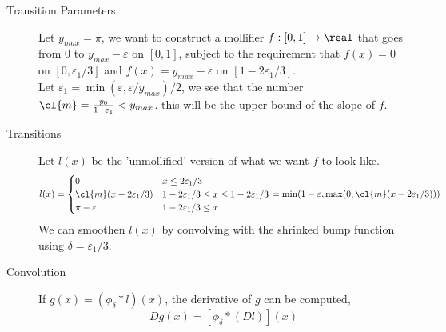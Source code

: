 \documentclass[../main-v2-manifolds.tex]{subfiles}
\begin{document}
\clearpage
    \begin{description}
    \item[Transition Parameters]
    Let $y_{max} = \pi$, we want to construct a mollifier $f:[0,1]\to\real$ that goes from $0$ to $y_{max} - \varepsilon$ on $[0,1]$, subject to the requirement that $f(x) = 0$ on $[0,\varepsilon_1/3]$ and $f(x) = y_{max} - \varepsilon$ on $[1-2\varepsilon_1/3]$.\\
    
    Let $\varepsilon_1 = \min(\varepsilon,\varepsilon/y_{max})/2$, we see that the number $\cl{m} = \frac{y_0}{1-\varepsilon_1}<y_{max}$. this will be the upper bound of the slope of $f$.
    \item[Transitions]
    Let $l(x)$ be the 'unmollified' version of what we want $f$ to look like.
    \[
        l(x) = \begin{cases}
            0 & x\leq 2\varepsilon_1/3\\ 
            \cl{m}(x-2\varepsilon_1/3) & 1-2\varepsilon_1/3\leq x\leq 1-2\varepsilon_1/3\\
            \pi-\varepsilon & 1-2\varepsilon_1/3\leq x
        \end{cases} = \min(1-\varepsilon,\max(0,\cl{m}(x-2\varepsilon_1/3)))
    \]
    We can smoothen $l(x)$ by convolving with the shrinked bump function using $\delta = \varepsilon_1/3$. 
    \item[Convolution]
    If $g(x) = (\phi_{\delta}\ast l)(x)$, the derivative of $g$ can be computed, 
    \[
        Dg(x) = [\phi_\delta\ast( Dl)](x)
    \]
\end{description}
\end{document}
